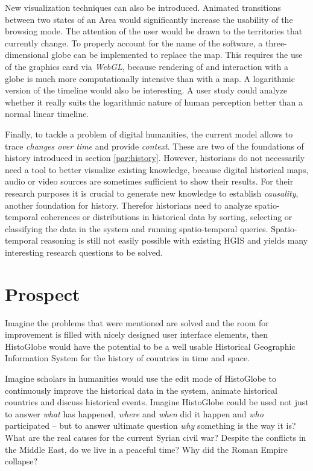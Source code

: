 New visualization techniques can also be introduced. Animated transitions between two states of an Area would significantly increase the usability of the browsing mode. The attention of the user would be drawn to the territories that currently change. To properly account for the name of the software, a three-dimensional globe can be implemented to replace the map. This requires the use of the graphics card via \emph{WebGL}, because rendering of and interaction with a globe is much more computationally intensive than with a map. A logarithmic version of the timeline would also be interesting. A user study could analyze whether it really suits the logarithmic nature of human perception better than a normal linear timeline.

Finally, to tackle a problem of digital humanities, the current model allows to trace \emph{changes over time} and provide \emph{context}. These are two of the foundations of history introduced in section \ref{par:history}. However, historians do not necessarily need a tool to better visualize existing knowledge, because digital historical maps, audio or video sources are sometimes sufficient to show their results. For their research purposes it is crucial to generate new knowledge to establish \emph{causality}, another foundation for history. Therefor historians need to analyze spatio-temporal coherences or distributions in historical data by sorting, selecting or classifying the data in the system and running spatio-temporal queries. Spatio-temporal reasoning is still not easily possible with existing HGIS and yields many interesting research questions to be solved.


\newpage
\section{Prospect} %
\label{sec:prospect}

Imagine the problems that were mentioned are solved and the room for improvement is filled with nicely designed user interface elements, then HistoGlobe would have the potential to be a well usable Historical Geographic Information System for the history of countries in time and space.

Imagine scholars in humanities would use the edit mode of HistoGlobe to continuously improve the historical data in the system, animate historical countries and discuss historical events. Imagine HistoGlobe could be used not just to answer \emph{what} has happened, \emph{where} and \emph{when} did it happen and \emph{who} participated -- but to answer ultimate question \emph{why} something is the way it is?
What are the real causes for the current Syrian civil war?
Despite the conflicts in the Middle East, do we live in a peaceful time?
Why did the Roman Empire collapse?

